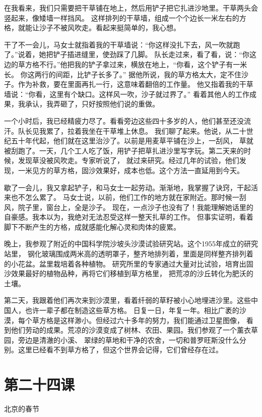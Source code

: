 \documentclass[12pt,UTF8]{ctexbook}
\begin{document}
在我看来，我们只需要把干草铺在地上，然后用铲子把它扎进沙地里。干草两头会竖起来，像矮墙一样挡风。
这样排列的干草墙，组成一个个边长一米左右的方格，就能让沙子不被风吹走。看起来挺简单的，我心想。

干了不一会儿，马女士就指着我的干草墙说：“你这样没扎下去，风一吹就跑了。”说着，她把铲子插进缝里，使劲踩了几脚。
队长走过来，看了看，说：“你这边的草方格不行。”他把我的铲子拿过来，横放在地上，“你看，这个铲子有一米长。
你这两行的间距，比铲子长多了。”
据他所说，我的草方格太大，定不住沙子。作为补救，要在里面再扎一行，这意味着翻倍的工作量。
他又指着我的干草墙说：“你看，这里有个缺口。这样风一吹，沙子就过界了。”
看着其他人的工作成果，我承认，我弄砸了，只好按照他们说的重做。

一个小时后，我已经精疲力尽了。看看旁边这些四十多岁的人，他们甚至还没流汗。队长见我累了，拉着我坐在干草堆上休息。
我们聊了起来。他说，从二十世纪五十年代起，他们就在这里治沙了。以前是用麦草平铺在沙上，一刮风，
草就被刮跑了。一天，几个工人吃了饭，用铲子把草扎进沙里写字玩。第二天来的时候，发现草没被风吹走。专家听说了，
就过来研究。经过几年的试验，他们发现，一米见方的草方格，固沙效果好，成本也低。这个方法一直延用到今天。

歇了一会儿，我又拿起铲子，和马女士一起劳动。渐渐地，我掌握了诀窍，干起活来也不怎么累了。
马女士说，以前，他们工作的地方就在家附近。那时候一刮风，院子里，窗台上，全是沙子。
现在，一点沙子也没有了！我能理解她话里的自豪感。我本以为，我绝对无法忍受这样一整天扎草的工作。
但事实证明，看着脚下不断产生的方格，成就感能化解心灵和肉体的疲累。

晚上，我参观了附近的中国科学院沙坡头沙漠试验研究站。这个1955年成立的研究站里，
钢化玻璃围成两米高的透明罩子，整齐地排列着，里面是同样整齐排列着的小花盆。盆里栽培着各种植物。
研究所里的专家通过大量对比试验，培育出固沙效果最好的植物品种，再将它们移植到草方格里，
把荒凉的沙丘转化为肥沃的土壤。

第二天，我跟着他们再次来到沙漠里，看着纤弱的草籽被小心地埋进沙里。这些中国人，也许一辈子都在制造这些草方格。
日复一日，年复一年。相比广袤的沙漠，每个草方格是这样渺小。但经过六十多年的努力，我们能通过卫星图像，
看到他们劳动的成果。荒凉的沙漠变成了树林、农田、果园。我们参观了一个薰衣草园，旁边是清澈的小溪、
翠绿的草地和干净的农舍，一切和普罗旺斯没什么分别。这里已经看不到草方格了，但这个世界会记得，它们曾经存在过。

\section{第二十四课}

北京的春节
\end{document}
